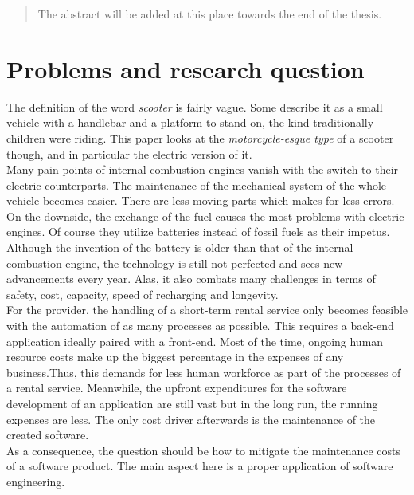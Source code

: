 \documentclass[12pt,a4paper]{report}
\begin{document}



\begin{abstract}

The abstract will be added at this place towards the end of the thesis.

\end{abstract}


\tableofcontents



\chapter{Problems and research question} \label{chap:intro}


The definition of the word \emph{scooter} is fairly vague.
Some describe it as a small vehicle with a handlebar and a platform to stand on,
the kind traditionally children were riding.
This paper looks at the \emph{motorcycle-esque type} of a scooter though, and in
particular the electric version of it.\\
Many pain points of internal combustion engines vanish with the switch to their electric
counterparts. The maintenance of the mechanical system of the whole vehicle becomes easier.
There are less moving parts which makes for less errors.
On the downside, the exchange of the fuel causes the most problems with electric engines.
Of course they utilize batteries instead of fossil fuels as their impetus.
Although the invention of the battery is older than that of the
internal combustion engine\cn, the technology is still not perfected and sees new
advancements every year. Alas, it also combats many challenges in terms of
safety, cost, capacity, speed of recharging and longevity.\\
For the provider, the handling of a short-term rental service
only becomes feasible with the automation of as many processes as possible.
This requires a back-end application ideally paired with a front-end.
Most of the time, ongoing human resource costs make up the biggest percentage
in the expenses of any business.\cn Thus, this demands for less human workforce
as part of the processes of a rental service.
Meanwhile, the upfront expenditures for the software development of
an application are still vast but in the long run, the running expenses are less.
The only cost driver afterwards is the maintenance of the created software.\\
As a consequence, the question should be how to mitigate the maintenance costs
of a software product. The main aspect here is a proper application of software engineering.
\end{document}
